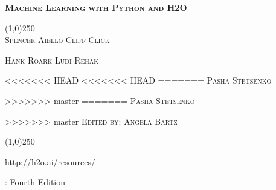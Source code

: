 %









\thispagestyle{empty} %


\begin{center}
\textsc{\Large\bf{Machine Learning with Python and H2O}}

\bigskip
\line(1,0){250}  %
\\
\bigskip
\small
\textsc{Spencer Aiello \hspace{10pt} Cliff Click  \hspace{10pt} }

\textsc{Hank Roark  \hspace{10pt} Ludi Rehak}

<<<<<<< HEAD
<<<<<<< HEAD
=======
\textsc{Pasha Stetsenko}

>>>>>>> master
=======
\textsc{Pasha Stetsenko}

>>>>>>> master
\textsc{Edited by: Angela Bartz}

\normalsize

\line(1,0){250}  %

{\url{http://h2o.ai/resources/}}

\bigskip

\monthname \hspace{1pt}  \the\year: Fourth Edition

\bigskip
\end{center}


